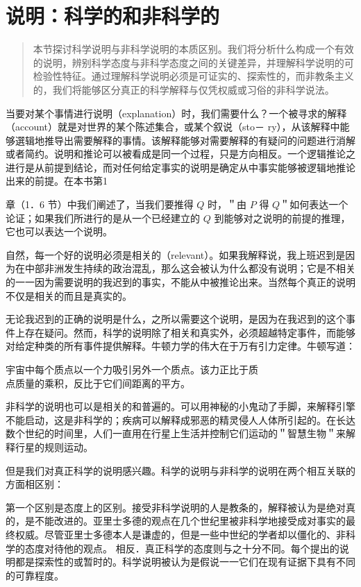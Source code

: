\section{说明：科学的和非科学的}

\begin{quotation}
本节探讨科学说明与非科学说明的本质区别。我们将分析什么构成一个有效的说明，辨别科学态度与非科学态度之间的关键差异，并理解科学说明的可检验性特征。通过理解科学说明必须是可证实的、探索性的，而非教条主义的，我们将能够区分真正的科学解释与仅凭权威或习俗的非科学说法。
\end{quotation}

当要对某个事情进行说明（explanation）时，我们需要什么？一个被寻求的解释（account）就是对世界的某个陈述集合，或某个叙说（sto－ ry），从该解释中能够選辑地推导出需要解释的事情。该解释能够对需要解释的有疑问的问题进行消解或者简约。说明和推论可以被看成是同一个过程，只是方向相反。一个逻辑推论之进行是从前提到结论，而对任何给定事实的说明是确定从中事实能够被逻辑地推论出来的前提。在本书第1

章（1．6 节）中我们阐述了，当我们要推得 $Q$ 时，＂由 $P$ 得 $Q$＂如何表达一个论证；如果我们所进行的是从一个已经建立的 $Q$ 到能够对之说明的前提的推理，它也可以表达一个说明。

自然，每一个好的说明必须是相关的（relevant）。如果我解释说，我上班迟到是因为在中部非洲发生持续的政治混乱，那么这会被认为什么都没有说明；它是不相关的一一因为需要说明的我迟到的事实，不能从中被推论出来。当然每个真正的说明不仅是相关的而且是真实的。

无论我迟到的正确的说明是什么，之所以需要这个说明，是因为在我迟到的这个事件上存在疑问。然而，科学的说明除了相关和真实外，必须超越特定事件，而能够对给定种类的所有事件提供解释。牛顿力学的伟大在于万有引力定律。牛顿写道：

\begin{displayquote}
宇宙中每个质点以一个力吸引另外一个质点。该力正比于质\\
点质量的乘积，反比于它们间距离的平方。
\end{displayquote}

非科学的说明也可以是相关的和普遍的。可以用神秘的小鬼动了手脚，来解释引擎不能启动，这是非科学的；疾病可以解释成邪恶的精灵侵人人体所引起的。在长达数个世纪的时间里，人们一直用在行星上生活并控制它们运动的＂智慧生物＂来解释行星的规则运动。

但是我们对真正科学的说明感兴趣。科学的说明与非科学的说明在两个相互关联的方面相区别：

第一个区别是态度上的区别。接受非科学说明的人是教条的，解释被认为是绝对真的，是不能改进的。亚里士多德的观点在几个世纪里被非科学地接受成对事实的最终权威。尽管亚里士多德本人是谦虚的，但是一些中世纪的学者却以僵化的、非科学的态度对待他的观点。\cite{crombie1960} 相反．真正科学的态度则与之十分不同。每个提出的说明都是探索性的或暂时的。科学说明被认为是假说一一它们在现有证据下具有不同的可靠程度。

